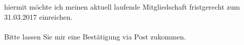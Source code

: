 \documentclass[11pt]{g-brief}
\begin{document}
\begin{g-brief}
hiermit möchte ich meinen aktuell laufende Mitgliedschaft fristgerecht zum 31.03.2017 einreichen. \\
\\
Bitte lassen Sie mir eine Bestätigung via Post zukommen. 

\end{g-brief}
\end{document}
